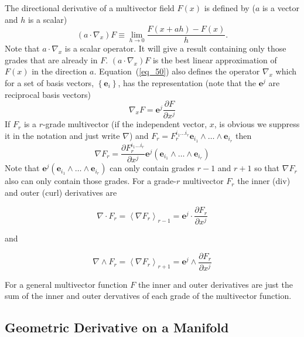 \documentclass[12pt]{report}
\newcommand{\bm}[1]{\boldsymbol{#1}}
\newcommand{\bfrac}[2]{\displaystyle\frac{#1}{#2}}
\newcommand{\lp}{\left (}
\newcommand{\rp}{\right )}
\newcommand{\pdiff}[2]{\bfrac{\partial {#1}}{\partial {#2}}}
\newcommand{\lbrc}{\left \{}
\newcommand{\rbrc}{\right \}}
\newcommand{\set}[1]{\lbrc {#1} \rbrc}
\newcommand{\W}{\wedge}
\newcommand{\f}[2]{{#1}\lp {#2} \rp}
\newcommand{\paren}[1]{\lp {#1} \rp}
\newcommand{\be}{\begin{equation}}
\newcommand{\ee}{\end{equation}}
\begin{document}
The directional derivative of a multivector field $\f{F}{x}$ is defined by ($a$ is a vector and $h$ is a scalar)
\be\label{eq_50}
 \paren{a\cdot\nabla_{x}}F \equiv \lim_{h\rightarrow 0}\bfrac{\f{F}{x+ah}-\f{F}{x}}{h}.
\ee
Note that $a\cdot\nabla_{x}$ is a scalar operator.  It will give a result containing only those grades
that are already in $F$.  $\paren{a\cdot\nabla_{x}}F$ is the best linear approximation of $\f{F}{x}$
in the direction $a$.  Equation~(\ref{eq_50}) also defines the operator $\nabla_{x}$ which for a set of
basis vectors, $\set{\bm{e}_{i}}$, has the representation (note that the $\bm{e}^{j}$ are reciprocal 
basis vectors)
\begin{equation}
    \nabla_{x} F = \bm{e}^{j}\bfrac{\partial F}{\partial x^{j}}
\end{equation}
If $F_{r}$ is a $r$-grade multivector (if the independent vector, $x$, is obvious we suppress it in the
notation and just write $\nabla$) and
$F_{r} = F_{r}^{i_{1}\dots i_{r}}\bm{e}_{i_{1}}\W\dots\W \bm{e}_{i_{r}}$
then
  \begin{equation}
    \nabla F_{r} = \bfrac{\partial F_{r}^{i_{1}\dots i_{r}}}{\partial x^{j}}\bm{e}^{j}\lp\bm{e}_{i_{1}}\W
                 \dots\W \bm{e}_{i_{r}} \rp
  \end{equation}
Note that
$\bm{e}^{j}\lp\bm{e}_{i_{1}}\W\dots\W \bm{e}_{i_{r}} \rp$
can only contain grades $r-1$ and $r+1$ so that $\nabla F_{r}$
also can only contain those grades. For a grade-$r$ multivector
$F_{r}$ the inner (div) and outer (curl) derivatives are

  \begin{equation}
  \nabla\cdot F_{r} = \left < \nabla F_{r}\right >_{r-1} = \bm{e}^{j}\cdot \pdiff{F_{r}}{x^{j}}
  \end{equation}

and

  \begin{equation}
  \nabla\W F_{r} = \left < \nabla F_{r}\right >_{r+1} = \bm{e}^{j}\W \pdiff{F_{r}}{x^{j}}
  \end{equation}

For a general multivector function $F$ the inner and outer derivatives are
just the sum of the inner and outer dervatives of each grade of the multivector
function.

\subsection{Geometric Derivative on a Manifold}
\end{document}
